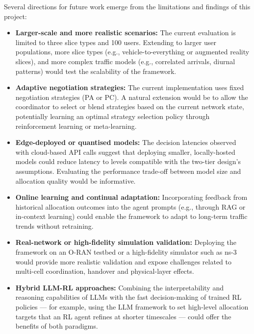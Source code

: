 Several directions for future work emerge from the limitations and findings of this project:

\begin{itemize}
    \item \textbf{Larger-scale and more realistic scenarios:} The current evaluation is limited to three slice types and 100 users. Extending to larger user populations, more slice types (e.g., vehicle-to-everything or augmented reality slices), and more complex traffic models (e.g., correlated arrivals, diurnal patterns) would test the scalability of the framework.

    \item \textbf{Adaptive negotiation strategies:} The current implementation uses fixed negotiation strategies (PA or PC). A natural extension would be to allow the coordinator to select or blend strategies based on the current network state, potentially learning an optimal strategy selection policy through reinforcement learning or meta-learning.

    \item \textbf{Edge-deployed or quantised models:} The decision latencies observed with cloud-based API calls suggest that deploying smaller, locally-hosted models could reduce latency to levels compatible with the two-tier design's assumptions. Evaluating the performance trade-off between model size and allocation quality would be informative.

    \item \textbf{Online learning and continual adaptation:} Incorporating feedback from historical allocation outcomes into the agent prompts (e.g., through RAG or in-context learning) could enable the framework to adapt to long-term traffic trends without retraining.

    \item \textbf{Real-network or high-fidelity simulation validation:} Deploying the framework on an O-RAN testbed or a high-fidelity simulator such as ns-3 would provide more realistic validation and expose challenges related to multi-cell coordination, handover and physical-layer effects.

    \item \textbf{Hybrid LLM-RL approaches:} Combining the interpretability and reasoning capabilities of LLMs with the fast decision-making of trained RL policies --- for example, using the LLM framework to set high-level allocation targets that an RL agent refines at shorter timescales --- could offer the benefits of both paradigms.
\end{itemize}

